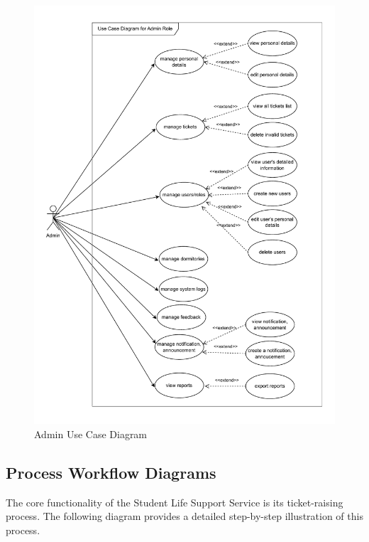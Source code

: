 	
	
	\begin{figure}[H]
		\centering
		\includegraphics[width=0.84\columnwidth]{graphics/admin-use-case.pdf}
		\caption{Admin Use Case Diagram}
		\label{fig:admin-use-case}
	\end{figure}
	
	
\subsection{Process Workflow Diagrams}	
The core functionality of the Student Life Support Service is its ticket-raising process. The following diagram provides a detailed step-by-step illustration of this process.


